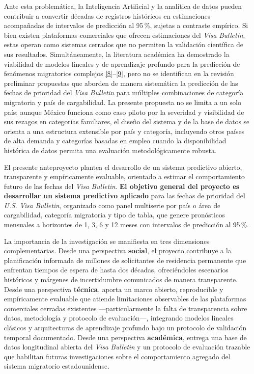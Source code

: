 \documentclass[12pt,letterpaper]{report}
\newcommand{\cita}[1]{\hyperref[bib:#1]{[#1]}}
\begin{document}
Ante esta problemática, la Inteligencia Artificial y la analítica de datos pueden contribuir a convertir décadas de registros históricos en estimaciones acompañadas de intervalos de predicción al 95\,\%, sujetas a contraste empírico. Si bien existen plataformas comerciales que ofrecen estimaciones del \textit{Visa Bulletin}, estas operan como sistemas cerrados que no permiten la validación científica de sus resultados. Simultáneamente, la literatura académica ha demostrado la viabilidad de modelos lineales y de aprendizaje profundo para la predicción de fenómenos migratorios complejos \cita{8}--\cita{9}, pero no se identifican en la revisión preliminar propuestas que aborden de manera sistemática la predicción de las fechas de prioridad del \textit{Visa Bulletin} para múltiples combinaciones de categoría migratoria y país de cargabilidad. La presente propuesta no se limita a un solo país: aunque México funciona como caso piloto por la severidad y visibilidad de sus rezagos en categorías familiares, el diseño del sistema y de la base de datos se orienta a una estructura extensible por país y categoría, incluyendo otros países de alta demanda y categorías basadas en empleo cuando la disponibilidad histórica de datos permita una evaluación metodológicamente robusta.

El presente anteproyecto plantea el desarrollo de un sistema predictivo abierto, transparente y empíricamente evaluable, orientado a estimar el comportamiento futuro de las fechas del \textit{Visa Bulletin}. \textbf{El objetivo general del proyecto es desarrollar un sistema predictivo aplicado} para las fechas de prioridad del \textit{U.S. Visa Bulletin}, organizado como panel multiserie por país o área de cargabilidad, categoría migratoria y tipo de tabla, que genere pronósticos mensuales a horizontes de 1, 3, 6 y 12 meses con intervalos de predicción al 95\,\%.

La importancia de la investigación se manifiesta en tres dimensiones complementarias. Desde una perspectiva \textbf{social}, el proyecto contribuye a la planificación informada de millones de solicitantes de residencia permanente que enfrentan tiempos de espera de hasta dos décadas, ofreciéndoles escenarios históricos y márgenes de incertidumbre comunicados de manera transparente. Desde una perspectiva \textbf{técnica}, aporta un marco abierto, reproducible y empíricamente evaluable que atiende limitaciones observables de las plataformas comerciales cerradas existentes ---particularmente la falta de transparencia sobre datos, metodología y protocolo de evaluación---, integrando modelos lineales clásicos y arquitecturas de aprendizaje profundo bajo un protocolo de validación temporal documentado. Desde una perspectiva \textbf{académica}, entrega una base de datos longitudinal abierta del \textit{Visa Bulletin} y un protocolo de evaluación trazable que habilitan futuras investigaciones sobre el comportamiento agregado del sistema migratorio estadounidense.
\end{document}
